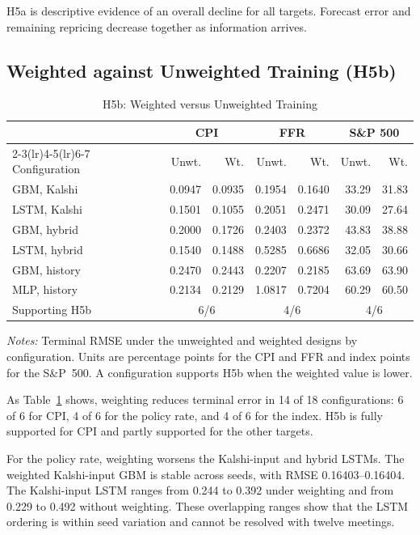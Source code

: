 \documentclass[12pt,a4paper]{report}
\newcommand{\tablenote}[1]{%
  \par\vspace{0.4em}%
  \begin{minipage}{0.9\textwidth}%
  \footnotesize\raggedright\emph{Notes:} #1%
  \end{minipage}%
}
\begin{document}
H5a is descriptive evidence of an overall decline for all targets. Forecast
error and remaining repricing decrease together as information arrives.

\subsection{Weighted against Unweighted Training (H5b)}
\label{sec:results-h5b}

\begin{table}[htbp]
\centering
\caption{H5b: Weighted versus Unweighted Training}
\label{tab:h5b}
\small
\begin{tabular}{@{}lrrrrrr@{}}
\toprule
 & \multicolumn{2}{c}{CPI} & \multicolumn{2}{c}{FFR}
 & \multicolumn{2}{c}{S\&P 500} \\
\cmidrule(lr){2-3}\cmidrule(lr){4-5}\cmidrule(lr){6-7}
Configuration & Unwt. & Wt. & Unwt. & Wt. & Unwt. & Wt. \\
\midrule
GBM, Kalshi & 0.0947 & 0.0935 & 0.1954 & 0.1640 & 33.29 & 31.83 \\
LSTM, Kalshi & 0.1501 & 0.1055 & 0.2051 & 0.2471 & 30.09 & 27.64 \\
GBM, hybrid & 0.2000 & 0.1726 & 0.2403 & 0.2372 & 43.83 & 38.88 \\
LSTM, hybrid & 0.1540 & 0.1488 & 0.5285 & 0.6686 & 32.05 & 30.66 \\
GBM, history & 0.2470 & 0.2443 & 0.2207 & 0.2185 & 63.69 & 63.90 \\
MLP, history & 0.2134 & 0.2129 & 1.0817 & 0.7204 & 60.29 & 60.50 \\
\midrule
Supporting H5b & \multicolumn{2}{c}{6/6} & \multicolumn{2}{c}{4/6}
 & \multicolumn{2}{c}{4/6} \\
\bottomrule
\end{tabular}
\tablenote{Terminal RMSE under the unweighted and weighted designs by
configuration. Units are percentage points for the CPI and FFR and index
points for the S\&P~500. A configuration supports H5b when the weighted value
is lower.}
\end{table}

As Table~\ref{tab:h5b} shows, weighting reduces terminal error in 14 of 18
configurations: 6 of 6 for CPI,
4 of 6 for the policy rate, and 4 of 6 for the index. H5b is fully supported
for CPI and partly supported for the other targets.

For the policy rate, weighting worsens the Kalshi-input and hybrid LSTMs. The
weighted Kalshi-input GBM is stable across seeds, with RMSE 0.16403--0.16404.
The Kalshi-input LSTM ranges from 0.244 to 0.392 under weighting and from 0.229
to 0.492 without weighting. These overlapping ranges show that the LSTM
ordering is within seed variation and cannot be resolved with twelve meetings.
\end{document}

